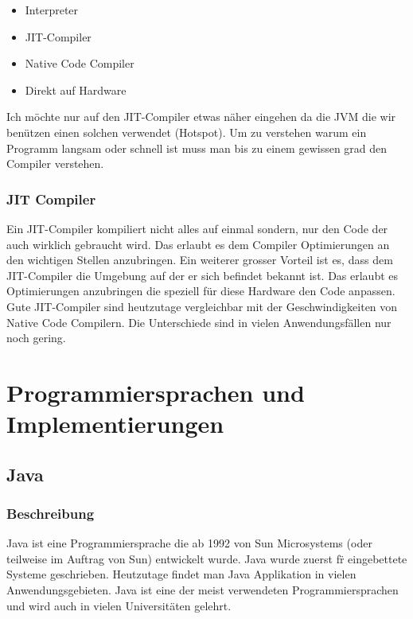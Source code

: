 \documentclass{fancydocument}
\begin{document}
\begin{itemize}
\item Interpreter
\item JIT-Compiler
\item Native Code Compiler
\item Direkt auf Hardware
\end{itemize}

Ich m\"ochte nur auf den JIT-Compiler etwas n\"aher eingehen da die JVM
die wir ben\"utzen einen solchen verwendet (Hotspot). Um zu verstehen warum ein
Programm langsam oder schnell ist muss man bis zu einem gewissen grad
den Compiler verstehen.

\subsubsection{JIT Compiler}

Ein JIT-Compiler kompiliert nicht alles auf einmal sondern, nur den
Code der auch wirklich gebraucht wird. Das erlaubt es dem Compiler
Optimierungen an den wichtigen Stellen anzubringen. Ein weiterer
grosser Vorteil ist es, dass dem JIT-Compiler die Umgebung auf der er
sich befindet bekannt ist. Das erlaubt es Optimierungen anzubringen
die speziell für diese Hardware den Code anpassen.
\\
Gute JIT-Compiler sind heutzutage vergleichbar mit der Geschwindigkeiten
von Native Code Compilern. Die Unterschiede sind in vielen
Anwendungsf\"allen nur noch gering.

\section{Programmiersprachen und Implementierungen}


\subsection{Java}
\subsubsection{Beschreibung}

Java ist eine Programmiersprache die ab 1992 von Sun Microsystems (oder
teilweise im Auftrag von Sun) entwickelt wurde. Java wurde zuerst f\"r
eingebettete Systeme geschrieben. Heutzutage findet man Java Applikation in
vielen Anwendungsgebieten.
Java ist eine der meist verwendeten Programmiersprachen und wird auch
in vielen Universitäten gelehrt. 
\end{document}
